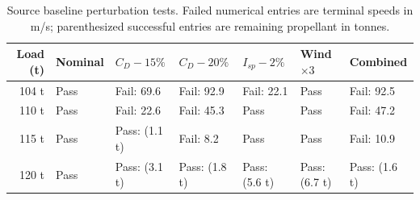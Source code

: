 \begin{table}[htbp]
\caption{Source baseline perturbation tests. Failed numerical entries are terminal speeds in m/s; parenthesized successful entries are remaining propellant in tonnes.}
\label{tab:src5}
\small
\setlength{\tabcolsep}{3.5pt}
\begin{tabularx}{\linewidth}{@{}rXXXXXX@{}}
\toprule
Load (t) & Nominal & $C_D-15\%$ & $C_D-20\%$ & $I_{sp}-2\%$ & Wind $\times3$ & Combined \\
\midrule
104 t & Pass & Fail: 69.6 & Fail: 92.9 & Fail: 22.1 & Pass & Fail: 92.5 \\
110 t & Pass & Fail: 22.6 & Fail: 45.3 & Pass & Pass & Fail: 47.2 \\
115 t & Pass & Pass: (1.1 t) & Fail: 8.2 & Pass & Pass & Fail: 10.9 \\
120 t & Pass & Pass: (3.1 t) & Pass: (1.8 t) & Pass: (5.6 t) & Pass: (6.7 t) & Pass: (1.6 t) \\
\bottomrule
\end{tabularx}
\end{table}
